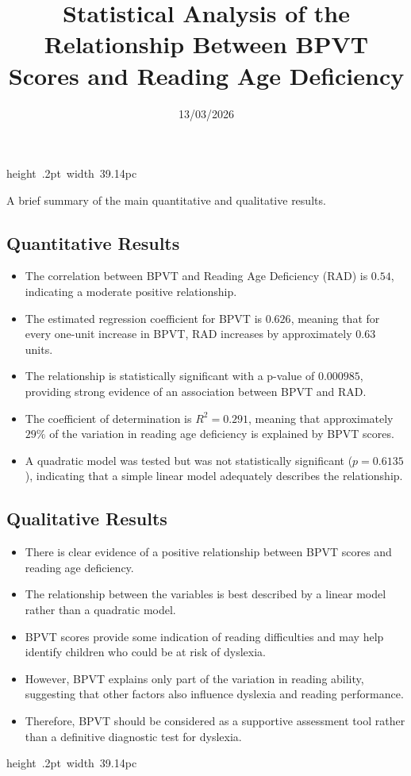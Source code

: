 \documentclass[11pt, a4paper]{article}
\title{Statistical Analysis of the Relationship Between BPVT Scores and Reading Age Deficiency \\
\authorfont{\small \textbf{240145846}} }
\date{13/03/2026}
\renewenvironment{abstract}
 {{%
    \setlength{\leftmargin}{0mm}
    \setlength{\rightmargin}{\leftmargin}%
  }%
  \relax}
 {\endlist}
\begin{document}
	

\maketitle


\begin{abstract}
    \hbox{\vrule height .2pt width 39.14pc}
    \vskip 8.5pt %

\noindent A brief summary of the main quantitative and qualitative results.

\subsection*{Quantitative Results}

\begin{itemize}
\item The correlation between BPVT and Reading Age Deficiency (RAD) is $0.54$, indicating a moderate positive relationship.
\item The estimated regression coefficient for BPVT is $0.626$, meaning that for every one-unit increase in BPVT, RAD increases by approximately $0.63$ units.
\item The relationship is statistically significant with a p-value of $0.000985$, providing strong evidence of an association between BPVT and RAD.
\item The coefficient of determination is $R^2 = 0.291$, meaning that approximately $29\%$ of the variation in reading age deficiency is explained by BPVT scores.
\item A quadratic model was tested but was not statistically significant ($p = 0.6135$), indicating that a simple linear model adequately describes the relationship.
\end{itemize}

\subsection*{Qualitative Results}

\begin{itemize}
\item There is clear evidence of a positive relationship between BPVT scores and reading age deficiency.
\item The relationship between the variables is best described by a linear model rather than a quadratic model.
\item BPVT scores provide some indication of reading difficulties and may help identify children who could be at risk of dyslexia.
\item However, BPVT explains only part of the variation in reading ability, suggesting that other factors also influence dyslexia and reading performance.
\item Therefore, BPVT should be considered as a supportive assessment tool rather than a definitive diagnostic test for dyslexia.
\end{itemize}

  \hbox{\vrule height .2pt width 39.14pc}
\end{abstract}
\end{document}
